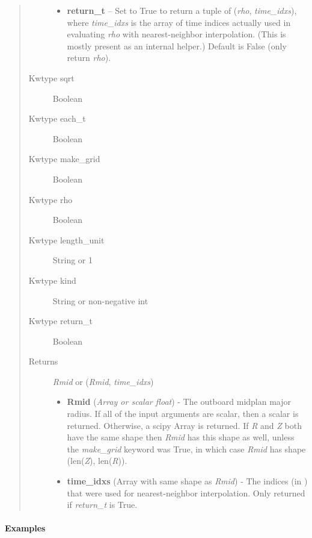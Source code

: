 \documentclass[letterpaper,10pt,english]{sphinxmanual}
\begin{document}
\begin{fulllineitems}
\begin{fulllineitems}
\begin{quote}
\begin{description}
\begin{itemize}
\item {} 
\textbf{return\_t} -- Set to True to return a tuple of (\emph{rho},
\emph{time\_idxs}), where \emph{time\_idxs} is the array of time indices
actually used in evaluating \emph{rho} with nearest-neighbor
interpolation. (This is mostly present as an internal helper.)
Default is False (only return \emph{rho}).

\end{itemize}

\item[{Kwtype sqrt}] \leavevmode
Boolean

\item[{Kwtype each\_t}] \leavevmode
Boolean

\item[{Kwtype make\_grid}] \leavevmode
Boolean

\item[{Kwtype rho}] \leavevmode
Boolean

\item[{Kwtype length\_unit}] \leavevmode
String or 1

\item[{Kwtype kind}] \leavevmode
String or non-negative int

\item[{Kwtype return\_t}] \leavevmode
Boolean

\item[{Returns}] \leavevmode

\emph{Rmid} or (\emph{Rmid}, \emph{time\_idxs})
\begin{itemize}
\item {} 
\textbf{Rmid} (\emph{Array or scalar float}) - The outboard midplan major
radius. If all of the input arguments are scalar, then a scalar
is returned. Otherwise, a scipy Array is returned. If \emph{R} and \emph{Z}
both have the same shape then \emph{Rmid} has this shape as well,
unless the \emph{make\_grid} keyword was True, in which case \emph{Rmid}
has shape (len(\emph{Z}), len(\emph{R})).

\item {} 
\textbf{time\_idxs} (Array with same shape as \emph{Rmid}) - The indices
(in ) that were used for
nearest-neighbor interpolation. Only returned if \emph{return\_t} is
True.

\end{itemize}


\end{description}\end{quote}
\paragraph{Examples}


\end{fulllineitems}
\end{fulllineitems}
\end{document}
